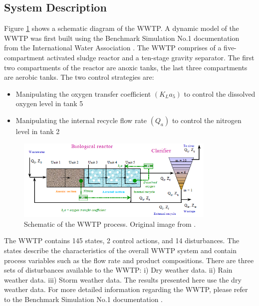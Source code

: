\subsection{System Description}
Figure \ref{fig:03WWTP} shows a schematic diagram of the WWTP.  A dynamic model of the WWTP was first built using the Benchmark Simulation No.1 documentation from the International Water Association \cite{wwtp}.  The WWTP comprises of a five-compartment activated sludge reactor and a ten-stage gravity separator.  The first two compartments of the reactor are anoxic tanks, the last three compartments are aerobic tanks.  The two control strategies are:

\begin{itemize}
	\item Manipulating the oxygen transfer coefficient $(K_La_5)$ to control the dissolved oxygen level in tank 5 
	\item Manipulating the internal recycle flow rate $(Q_a)$ to control the nitrogen level in tank 2
\end{itemize}

\begin{figure}[H]
    \centering
    \includegraphics[width=0.85\textwidth]{images/ch3/WWTP.png}
    \caption{Schematic of the WWTP process. Original image from \cite{wwtp}.}
    \label{fig:03WWTP}
\end{figure}

The WWTP contains 145 states, 2 control actions, and 14 disturbances.  The states describe the characteristics of the overall WWTP system and contain process variables such as the flow rate and product compositions.  There are three sets of disturbances available to the WWTP: i) Dry weather data. ii) Rain weather data. iii) Storm weather data.  The results presented here use the dry weather data. For more detailed information regarding the WWTP, please refer to the Benchmark Simulation No.1 documentation \cite{wwtp}.

